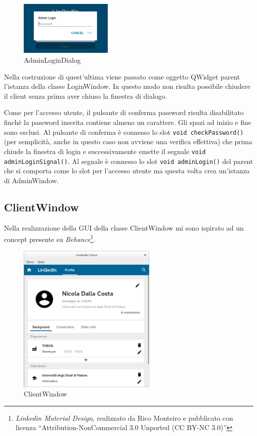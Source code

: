 \documentclass[a4paper,10pt]{article}
\begin{document}
\begin{figure}[!ht]
\centering
\includegraphics[width=0.4\textwidth]{AdminLoginDialog.png}
\caption{AdminLoginDialog}
\end{figure}

Nella costruzione di quest'ultima viene passato come oggetto QWidget parent l'istanza della classe LoginWindow. In questo modo non risulta possibile chiudere il client senza prima aver chiuso la finestra di dialogo.

Come per l'accesso utente, il pulsante di conferma password risulta disabilitato finchè la password inserita contiene almeno un carattere. Gli spazi ad inizio e fine sono esclusi. Al pulsante di conferma è connesso lo slot \texttt{void checkPassword()} (per semplicità, anche in questo caso non avviene una verifica effettiva) che prima chiude la finestra di login e successivamente emette il segnale \texttt{void adminLoginSignal()}. Al segnale è connesso lo slot \texttt{void adminLogin()} del parent che si comporta come lo slot per l'accesso utente ma questa volta crea un'istanza di AdminWindow.

\subsection*{ClientWindow}
Nella realizzazione della GUI della classe ClientWindow mi sono ispirato ad un concept presente su \textit{Behance}\footnote{\textit{Linkedin Material Design}, realizzato da Rico Monteiro e pubblicato con licenza ``Attribution-NonCommercial 3.0 Unported (CC BY-NC 3.0)''}.

\begin{figure}[!ht]
\centering
\includegraphics[width=0.6\textwidth]{ClientWindow.png}
\caption{ClientWindow}
\end{figure}
\end{document}
